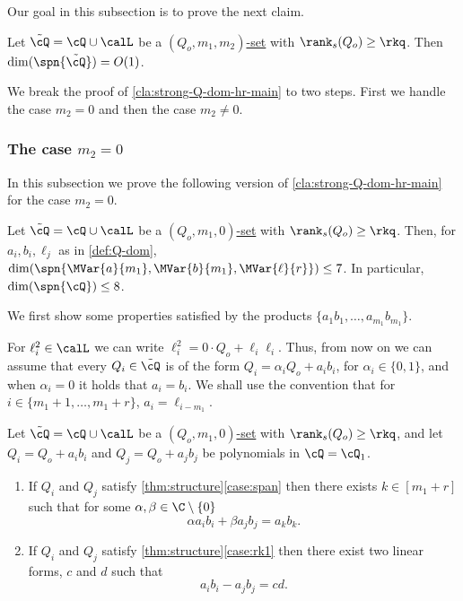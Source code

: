 Our goal in this subsection is to prove the next claim.

\begin{claim}\label{cla:strong-Q-dom-hr-main}
Let $\tilde{\cQ} = \cQ \cup \calL$ be a \hyperref[def:Q-dom]{$(Q_o,m_1,m_2)$-set} with $\rank_s(Q_o)\geq \rkq$.
Then $\dim(\spn{\tilde{\cQ}}) = O(1)$.
\end{claim}

We break the proof of \autoref{cla:strong-Q-dom-hr-main} to two steps. First we handle the case $m_2=0$ and then the case $m_2\neq 0$.



\subsubsection{The case $m_2=0$}\label{sec:m2=0-hr}

In this subsection we prove the following version of \autoref{cla:strong-Q-dom-hr-main} for the case $m_2=0$.

\begin{claim}\label{cla:strong-Q-dom-hr}
Let $\tilde{\cQ} = \cQ \cup \calL$ be a \hyperref[def:Q-dom]{$(Q_o,m_1,0)$-set} with $\rank_s(Q_o)\geq \rkq$.
Then, for $a_i,b_i, \ell_j$ as in \autoref{def:Q-dom}, $\dim(\spn{\MVar{a}{m_1}, \MVar{b}{m_1}, \MVar{\ell}{r}})\leq 7$. In particular, $\dim(\spn{\cQ}) \leq 8$.
\end{claim}

We first show some properties satisfied by the products $\lbrace a_1b_1, \ldots, a_{m_1}b_{m_1}\rbrace$.

\begin{remark}\label{rem:alpha}
	For $\ell_i^2 \in \calL$ we can write $\ell^2_i = 0\cdot Q_o + \ell_i\ell_i$. Thus, from now on we can assume that every $Q_i \in \tilde{\cQ}$ is of the form $Q_i = \alpha_i Q_o + a_ib_i$, for $\alpha_i\in\{0,1\}$, and when $\alpha_i =0$ it holds that $a_i=b_i$. We shall use the convention that for $i\in\{m_1+1,\ldots,m_1+r\}$, $a_i = \ell_{i-m_1}$.
\end{remark}

\begin{claim}\label{cla:span-rank1-hr}
Let $\tilde{\cQ} = \cQ \cup \calL$ be a \hyperref[def:Q-dom]{$(Q_o,m_1,0)$-set} with $\rank_s(Q_o)\geq \rkq$, and let  $Q_i=Q_o+a_ib_i$ and $Q_j= Q_o+a_jb_j$ be polynomials in $\cQ = \cQ_1$. 
\begin{enumerate}
\item If $Q_i$ and $Q_j$ satisfy \autoref{thm:structure}\ref{case:span} then there exists $k\in [m_1+r]$ such that for some $\alpha,\beta \in \C\setminus\{0\}$
\begin{equation} \label{eq:1-alpha-hr}
 \alpha a_ib_i + \beta a_jb_j = a_k b_k. 
\end{equation}
 \item If $Q_i$ and $Q_j$ satisfy \autoref{thm:structure}\ref{case:rk1} then there exist two linear forms, $c$ and $d$ such that
\begin{equation}
 a_ib_i -  a_jb_j = cd.
\end{equation}
\end{enumerate}
\end{claim}

